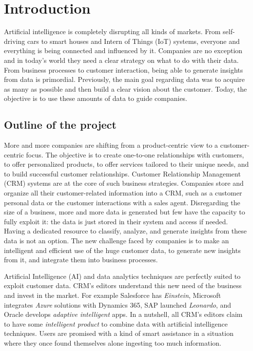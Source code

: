 \chapter{Introduction}

Artificial intelligence is completely disrupting all kinds of markets. From self-driving cars to smart houses and Intern of Things (IoT) systems, everyone and everything is being connected and influenced by it. Companies are no exception and in today's world they need a clear strategy on what to do with their data. From business processes to customer interaction, being able to generate insights from data is primordial. Previously, the main goal regarding data was to acquire as many as possible and then build a clear vision about the customer.  Today, the objective is to use these amounts of data to guide companies. 


\section{Outline of the project}

More and more companies are shifting from a product-centric view to a customer-centric focus. The objective is to create one-to-one relationships with customers, to offer personalized products, to offer services tailored to their unique needs, and to build successful customer relationships. Customer Relationship Management (CRM) systems are at the core of such business strategies. Companies store and organize all their customer-related information into a CRM, such as a customer personal data or the customer interactions with a sales agent. Disregarding the size of a business, more and more data is generated but few have the capacity to fully exploit it: the data is just stored in their system and access if needed. Having a dedicated resource to classify, analyze, and generate insights from these data is not an option. The new challenge faced by companies is to make an intelligent and efficient use of the huge customer data, to generate new insights from it, and integrate them into business processes.

Artificial Intelligence (AI) and data analytics techniques are perfectly suited to exploit customer data. CRM's editors understand this new need of the business and invest in the market. For example Salesforce has \textit{Einstein}, Microsoft integrates \textit{Azure} solutions with Dynamics 365, SAP launched \textit{Leonardo}, and Oracle develops \textit{adaptive intelligent} apps. In a nutshell, all CRM's editors claim to have some \textit{intelligent product} to combine data with artificial intelligence techniques. Users are promised with a kind of smart assistance in a situation where they once found themselves alone ingesting too much information. 

